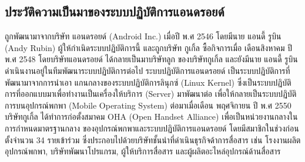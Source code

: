 \newpage
	\subsection{ประวัติความเป็นมาของระบบปฏิบัติการแอนดรอยด์}
ถูกพัฒนามาจากบริษัท แอนดรอยด์ (Android Inc.) เมื่อปี พ.ศ 2546 โดยมีนาย แอนดี้ รูบิน (Andy Rubin) ผู้ให้กำเนิดระบบปฏิบัติการนี้ และถูกบริษัท กูเกิ้ล ซื้อกิจการเมื่อ เดือนสิงหาคม ปี พ.ศ 2548 โดยบริษัทแอนดรอยด์ ได้กลายเป็นมาบริษัทลูก ของบริษัทกูเกิ้ล และยังมีนาย แอนดี้ รูบิน ดำเนินงานอยู่ในทีมพัฒนาระบบปฏิบัติการต่อไป
ระบบปฏิบัติการแอนดรอยด์ เป็นระบบปฏิบัติการที่พัฒนามาจากการนำเอา แกนกลางของระบบปฏิบัติการลินุกซ์ (Linux Kernel) ซึ่งเป็นระบบปฏิบัติการที่ออกแบบมาเพื่อทำงานเป็นเครื่องให้บริการ (Server) มาพัฒนาต่อ เพื่อให้กลายเป็นระบบปฏิบัติการบนอุปกรณ์พกพา (Mobile Operating System)
ต่อมาเมื่อเดือน พฤศจิกายน ปี พ.ศ 2550 บริษัทกูเกิ้ล ได้ทำการก่อตั้งสมาคม OHA (Open Handset Alliance) เพื่อเป็นหน่วยงานกลางในการกำหนดมาตรฐานกลาง ของอุปกรณ์พกพาและระบบปฏิบัติการแอนดรอยด์ โดยมีสมาชิกในช่วงก่อนตั้งจำนวน 34 รายเข้าร่วม ซึ่งประกอบไปด้วยบริษัทชั้นนำที่ดำเนินธุรกิจด้าการสื่อสาร เช่น โรงงานผลิตอุปกรณ์พกพา, บริษัทพัฒนาโปรแกรม, ผู้ให้บริการสื่อสาร และผู้ผลิตอะไหล่อุปกรณ์ด้านสื่อสาร \cite{bib2}
	

